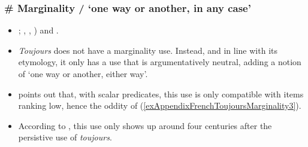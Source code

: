 \subsubsection{\# Marginality / \lq one way or another, in any case\rq{}}\label{appendixFrenchToujoursMarginal}
\begin{itemize}
	\item \textcite[s.v. \textit{toujours}]{Dicctionnaire}; \textcite{Fuchs1988}, \textcite{MosegaardHansen2002}, \citeyear[178–183]{MosegaardHansen2002}) and \textcite{Muller1991}.
	\item \textit{Toujours} does not have a marginality use. Instead, and in line with its etymology, it only has a use that is argumentatively neutral, adding a notion of \lq one way or another, either way\rq{}. 
	\item \textcite[178]{MosegaardHansen2008} points out that, with scalar predicates, this use is only compatible with items ranking low, hence the oddity of (\ref{exAppendixFrenchToujoursMarginality3}).
	\item According to \textcite[179]{MosegaardHansen2008}, this use only shows up around four centuries after the persistive use of \textit{toujours}.
\end{itemize}
